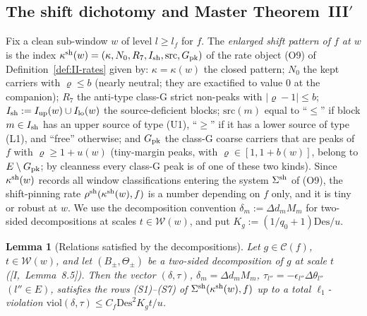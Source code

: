 \documentclass[10pt]{amsart}
\newtheorem{lemma}[theorem]{Lemma}
\theoremstyle{definition}
\theoremstyle{remark}
\newcommand{\Cset}{\mathcal C}
\begin{document}
\subsection{The shift dichotomy and Master Theorem~III$'$}\label{subsec:II-dichotomy}

Fix a clean sub-window $w$ of level $l\ge l_f$ for $f$.  The
\emph{enlarged shift pattern of $f$ at $w$} is the index
$\kappa^{\rm sh}(w)=(\kappa,N_0,R_7,I_{\rm sh},\mathrm{src},G_{\rm pk})$ of
the rate object (O9) of Definition~\ref{def:II-rates} given by: $\kappa=
\kappa(w)$ the closed pattern; $N_0$ the kept carriers with $\varrho\le b$
(nearly neutral; they are exactified to value $0$ at the companion);
$R_7$ the anti-type class-G strict non-peaks with $|\varrho-1|\le b$;
$I_{\rm sh}:=I_{\rm up}(w)\cup I_{\rm lo}(w)$ the source-deficient blocks;
$\mathrm{src}(m)$ equal to ``$\le$'' if block $m\in I_{\rm sh}$ has an
upper source of type (U1), ``$\ge$'' if it has a lower source of type (L1),
and ``free'' otherwise; and $G_{\rm pk}$ the class-G coarse carriers that
are peaks of $f$ with $\varrho\ge1+u(w)$ (tiny-margin peaks, with
$\varrho\in[1,1+b(w)]$, belong to $E\setminus G_{\rm pk}$; by cleanness
every class-G peak is of one of these two kinds).
Since $\kappa^{\rm sh}(w)$ records all window classifications entering the
system $\Sigma^{\rm sh}$ of (O9), the shift-pinning rate $\rho^{\rm
sh}(\kappa^{\rm sh}(w),f)$ is a number depending on $f$ only, and it is
tiny or robust at $w$.  We use the decomposition convention $\delta_m:=
\Delta d_mM_m$ for two-sided decompositions at scales $t\in\mathcal W(w)$, and
put $K_g:=(1/q_0+1)\mathrm{Des}/u$.

\begin{lemma}[Relations satisfied by the decompositions]\label{lem:II-R17}
Let $g\in\Cset(f)$, $t\in\mathcal W(w)$, and let $(B_\pm,\Theta_\pm)$ be a
two-sided decomposition of $g$ at scale $t$ \textup{(}[I,~Lemma~8.5]\textup{)}.
Then the vector $(\delta,\tau)$, $\delta_m=\Delta d_mM_m$, $\tau_{l''}=-
\epsilon_{l''}\Delta\theta_{l''}$ $(l''\in E)$, satisfies the rows
\textup{(S1)}--\textup{(S7)} of $\Sigma^{\rm sh}(\kappa^{\rm sh}(w),f)$ up to a
total $\ell_1$-violation $\mathrm{viol}(\delta,\tau)\le C_f\mathrm{Des}^2K_gt/u$.
\end{lemma}
\end{document}
